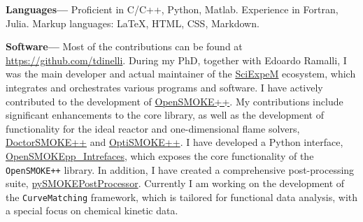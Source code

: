 {\bf Languages---}
Proficient in C/C++, Python, Matlab. Experience in Fortran, Julia. Markup languages:
\LaTeX, HTML, CSS, Markdown.


{\bf Software---}%
Most of the contributions can be found at
\href{https://github.com/tdinelli}{https://github.com/tdinelli}. During my PhD, together
with Edoardo Ramalli, I was the main developer and actual maintainer of the
\href{https://sciexpem.polimi.it/}{SciExpeM} ecosystem, which integrates and orchestrates
various programs and software. I have actively contributed to the development of
\href{https://www.opensmokepp.polimi.it/}{OpenSMOKE++}. My contributions include
significant enhancements to the core library, as well as the development of functionality
for the ideal reactor and one-dimensional flame solvers,
\href{https://www.opensmokepp.polimi.it/}{DoctorSMOKE++} and
\href{https://github.com/burn-research/OptiSMOKE_toolbox}{OptiSMOKE++}. I have developed a
Python interface,
\href{https://github.com/tdinelli/OpenSMOKEpp_Interfaces}{OpenSMOKEpp\_Intrefaces}, which
exposes the core functionality of the {\tt OpenSMOKE++} library. In addition, I have
created a comprehensive post-processing suite,
\href{https://github.com/tdinelli/pySMOKEPostProcessor}{pySMOKEPostProcessor}. Currently I
am working on the development of the \texttt{CurveMatching} framework, which is tailored
for functional data analysis, with a special focus on chemical kinetic data.

